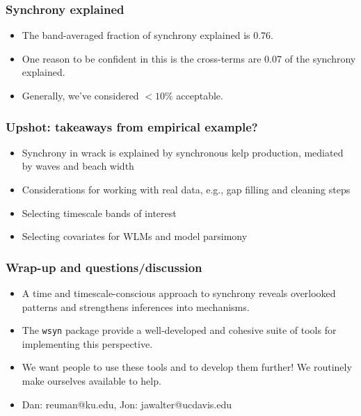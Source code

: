 \documentclass{beamer}
\begin{document}
\begin{frame}
\frametitle{Synchrony explained}
\begin{itemize}
\item The band-averaged fraction of synchrony explained is 0.76.
\item One reason to be confident in this is the cross-terms are 0.07 of the synchrony explained.
\item Generally, we've considered $<10\%$ acceptable.
\end{itemize}
\end{frame}

{
\begin{frame}
\frametitle{Upshot: takeaways from empirical example?}
\begin{itemize}
\item Synchrony in wrack is explained by synchronous kelp production, mediated by waves and beach width
\item Considerations for working with real data, e.g., gap filling and cleaning steps
\item Selecting timescale bands of interest
\item Selecting covariates for WLMs and model parsimony
\end{itemize}
\end{frame}}

\begin{frame}
\frametitle{Wrap-up and questions/discussion}
\begin{itemize}
\item A time and timescale-conscious approach to synchrony reveals overlooked patterns and strengthens inferences into mechanisms.
\item The \texttt{wsyn} package provide a well-developed and cohesive suite of tools for implementing this perspective.
\item We want people to use these tools and to develop them further! We routinely make ourselves available to help.
\item Dan: reuman@ku.edu, Jon: jawalter@ucdavis.edu
\end{itemize}


\end{frame}
\end{document}

